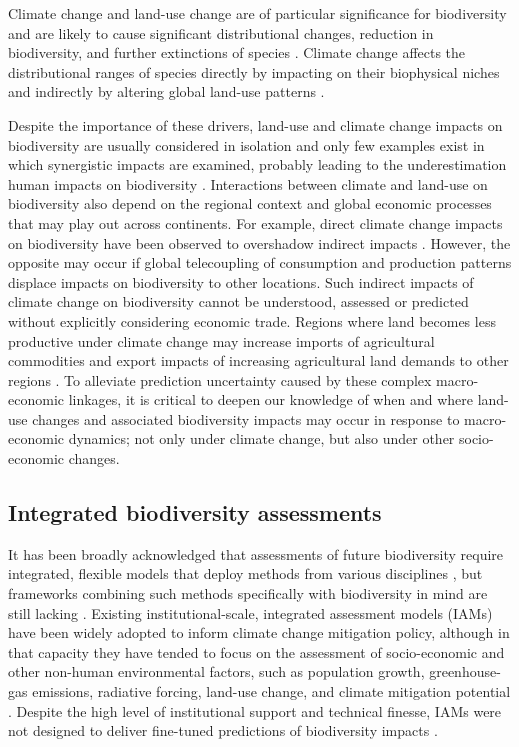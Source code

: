 \documentclass[titlesmallcaps,copyrightpage]{uomthesis}\usepackage[]{graphicx}\usepackage[]{color}
\begin{document}
Climate change and land-use change are of particular significance for biodiversity and are likely to cause significant distributional changes, reduction in biodiversity, and further extinctions of species \citep{ipbes_summary_2019, struebig_targeted_2015, newbold2019climate, kapitza_assessing_2021, foley_global_2005}. Climate change affects the distributional ranges of species directly by impacting on their biophysical niches and indirectly by altering global land-use patterns \citep{kapitza_assessing_2021}. 

Despite the importance of these drivers, land-use and climate change impacts on biodiversity are usually considered in isolation and only few examples exist in which synergistic impacts are examined, probably leading to the underestimation human impacts on biodiversity \citep{de_chazal_land-use_2009}. Interactions between climate and land-use on biodiversity also depend on the regional context and global economic processes that may play out across continents. For example, direct climate change impacts on biodiversity have been observed to overshadow indirect impacts \citep[where climate change affects species distributions via impacts on land use, ,][]{kapitza_assessing_2021}. However, the opposite may occur if global telecoupling of consumption and production patterns displace impacts on biodiversity to other locations. Such indirect impacts of climate change on biodiversity cannot be understood, assessed or predicted without explicitly considering economic trade. Regions where land becomes less productive under climate change may increase imports of agricultural commodities and export impacts of increasing agricultural land demands to other regions \citep{kapitza_assessing_2021, chaudhary_land_2016}. To alleviate prediction uncertainty caused by these complex macro-economic linkages, it is critical to deepen our knowledge of when and where land-use changes and associated biodiversity impacts may occur in response to macro-economic dynamics; not only under climate change, but also under other socio-economic changes.

\subsection{Integrated biodiversity assessments}
It has been broadly acknowledged that assessments of future biodiversity require integrated, flexible models that deploy methods from various disciplines \citep{ipbes_summary_2019}, but frameworks combining such methods specifically with biodiversity in mind are still lacking \citep{titeux_global_2017}. Existing institutional-scale, integrated assessment models (IAMs) have been widely adopted to inform climate change mitigation policy, although in that capacity they have tended to focus on the assessment of socio-economic and other non-human environmental factors, such as population growth, greenhouse-gas emissions, radiative forcing, land-use change, and climate mitigation potential \citep{riahi_shared_2017}. Despite the high level of institutional support and technical finesse, IAMs were not designed to deliver fine-tuned predictions of biodiversity impacts \citep{harfoot_integrated_2014}.
\end{document}
